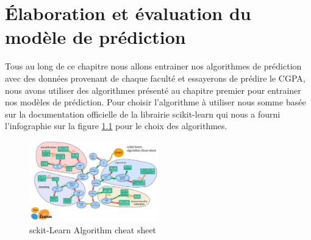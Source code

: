 \chapter{Élaboration  et évaluation du modèle de prédiction }
Tous au long de ce chapitre nous allons entrainer nos algorithmes de prédiction avec des données provenant de chaque faculté et essayerons de prédire le CGPA, nous  avons utiliser des algorithmes présenté au chapitre premier pour entrainer nos modèles de prédiction.
Pour choisir l'algorithme à utiliser nous somme basée sur la documentation officielle de la librairie scikit-learn \cite{pedregosa2011scikit} qui nous a fourni l'infographie sur la figure \ref{fig:skLearn1} pour le choix des algorithmes. \\

\begin{figure}[ht]
	\centering
	\includegraphics[width=0.5\textwidth]{fig/sckikLearnCheatSheet.png}
	\caption[Short caption]{sckit-Learn Algorithm cheat sheet }
	\label{fig:skLearn1}
\end{figure} 

